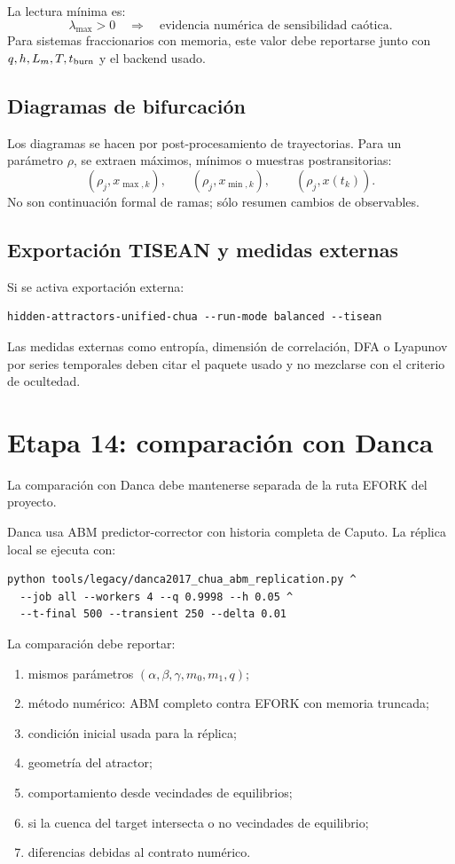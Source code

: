 \documentclass[11pt]{article}
\begin{document}
La lectura mínima es:
\begin{equation}
\lambda_{\max}>0
\quad \Rightarrow \quad
\text{evidencia numérica de sensibilidad caótica}.
\end{equation}
Para sistemas fraccionarios con memoria, este valor debe reportarse junto con \(q,h,L_m,T,t_{\rm burn}\) y el backend usado.

\subsection{Diagramas de bifurcación}

Los diagramas se hacen por post-procesamiento de trayectorias. Para un parámetro \(\rho\), se extraen máximos, mínimos o muestras postransitorias:
\begin{equation}
(\rho_j,x_{\max,k}),
\qquad
(\rho_j,x_{\min,k}),
\qquad
(\rho_j,x(t_k)).
\end{equation}
No son continuación formal de ramas; sólo resumen cambios de observables.

\subsection{Exportación TISEAN y medidas externas}

Si se activa exportación externa:
\begin{lstlisting}
hidden-attractors-unified-chua --run-mode balanced --tisean
\end{lstlisting}
Las medidas externas como entropía, dimensión de correlación, DFA o Lyapunov por series temporales deben citar el paquete usado y no mezclarse con el criterio de ocultedad.

\section{Etapa 14: comparación con Danca}

La comparación con Danca debe mantenerse separada de la ruta EFORK del proyecto.

Danca usa ABM predictor-corrector con historia completa de Caputo. La réplica local se ejecuta con:
\begin{lstlisting}
python tools/legacy/danca2017_chua_abm_replication.py ^
  --job all --workers 4 --q 0.9998 --h 0.05 ^
  --t-final 500 --transient 250 --delta 0.01
\end{lstlisting}

La comparación debe reportar:
\begin{enumerate}
\item mismos parámetros \((\alpha,\beta,\gamma,m_0,m_1,q)\);
\item método numérico: ABM completo contra EFORK con memoria truncada;
\item condición inicial usada para la réplica;
\item geometría del atractor;
\item comportamiento desde vecindades de equilibrios;
\item si la cuenca del target intersecta o no vecindades de equilibrio;
\item diferencias debidas al contrato numérico.
\end{enumerate}
\end{document}
